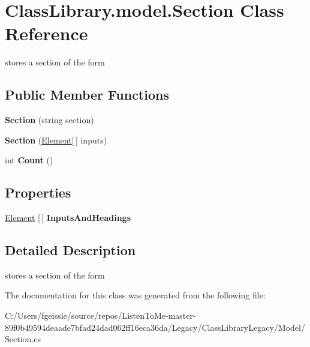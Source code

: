 \hypertarget{class_class_library_1_1model_1_1_section}{}\section{Class\+Library.\+model.\+Section Class Reference}
\label{class_class_library_1_1model_1_1_section}


stores a section of the form  


\subsection*{Public Member Functions}
\begin{DoxyCompactItemize}
\item 
\mbox{\label{class_class_library_1_1model_1_1_section_a75ced4ef5030417fbb973702bbc7abf5}} 
{\bfseries Section} (string section)
\item 
\mbox{\label{class_class_library_1_1model_1_1_section_a06bd8414c4432e223321ec33c6ac8ec9}} 
{\bfseries Section} (\mbox{\hyperlink{class_class_library_1_1model_1_1_element}{Element}}\mbox{[}$\,$\mbox{]} inputs)
\item 
\mbox{\label{class_class_library_1_1model_1_1_section_a4bb649d25002e9ee5e7024628c27192f}} 
int {\bfseries Count} ()
\end{DoxyCompactItemize}
\subsection*{Properties}
\begin{DoxyCompactItemize}
\item 
\mbox{\label{class_class_library_1_1model_1_1_section_a4b11dc6762605f645e9df241b3f0b698}} 
\mbox{\hyperlink{class_class_library_1_1model_1_1_element}{Element}} \mbox{[}$\,$\mbox{]} {\bfseries Inputs\+And\+Headings}
\end{DoxyCompactItemize}


\subsection{Detailed Description}
stores a section of the form 



The documentation for this class was generated from the following file\+:\begin{DoxyCompactItemize}
\item 
C\+:/\+Users/fgeissle/source/repos/\+Listen\+To\+Me-\/master-\/89f0b49594deaade7bfad24dad062ff16eca36da/\+Legacy/\+Class\+Library\+Legacy/\+Model/Section.\+cs\end{DoxyCompactItemize}
